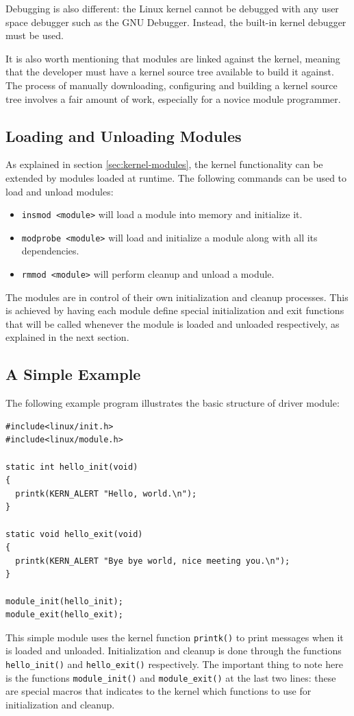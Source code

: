 Debugging is also different: the Linux kernel cannot be debugged with any user space debugger such as the GNU Debugger. Instead, the built-in kernel debugger must be used.

It is also worth mentioning that modules are linked against the kernel, meaning that the developer must have a kernel source tree available to build it against. The process of manually downloading, configuring and building a kernel source tree involves a fair amount of work, especially for a novice module programmer.


\subsection{Loading and Unloading Modules}
As explained in section \ref{sec:kernel-modules}, the kernel functionality can be extended by modules loaded at runtime. The following commands can be used to load and unload modules:
\begin{itemize}
  \item \texttt{insmod <module>} will load a module into memory and initialize it.
  \item \texttt{modprobe <module>} will load and initialize a module along with all its dependencies.
  \item \texttt{rmmod <module>} will perform cleanup and unload a module.
\end{itemize}
The modules are in control of their own initialization and cleanup processes. This is achieved by having each module define special initialization and exit functions that will be called whenever the module is loaded and unloaded respectively, as explained in the next section.


\subsection{A Simple Example}
The following example program illustrates the basic structure of driver module:
\lstset{style=lststyle-c}
\begin{lstlisting}
#include<linux/init.h>
#include<linux/module.h>

static int hello_init(void)
{
  printk(KERN_ALERT "Hello, world.\n");
}

static void hello_exit(void)
{
  printk(KERN_ALERT "Bye bye world, nice meeting you.\n");
}

module_init(hello_init);
module_exit(hello_exit);
\end{lstlisting}
This simple module uses the kernel function \texttt{printk()} to print messages when it is loaded and unloaded. Initialization and cleanup is done through the functions \texttt{hello\_init()} and \texttt{hello\_exit()} respectively. The important thing to note here is the functions \texttt{module\_init()} and \texttt{module\_exit()} at the last two lines: these are special macros that indicates to the kernel which functions to use for initialization and cleanup.

